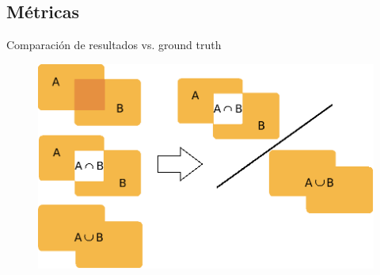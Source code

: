 \documentclass[]{beamer}
\begin{document}
\subsection{Métricas}
\begin{frame}[t]{Comparación de resultados vs. ground truth}
    \begin{figure}[t]
        \centering
        \includegraphics[scale=0.35]{img/pascal/pascal.png}
    \end{figure}
\end{frame}
\end{document}
